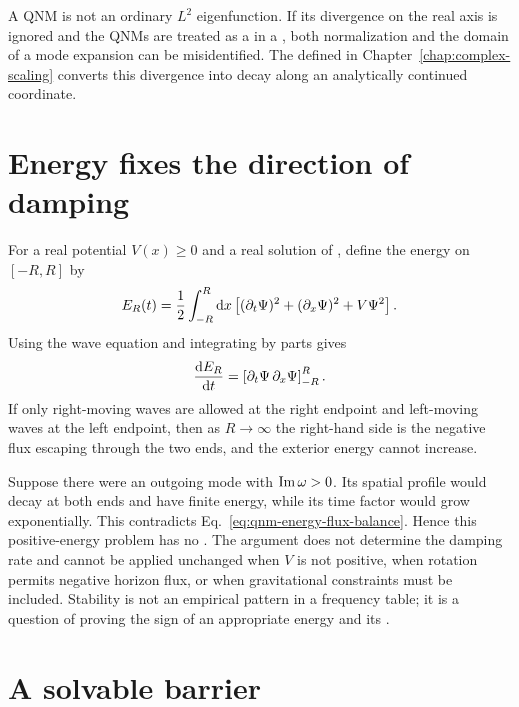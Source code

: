 \begin{warningbox}
A QNM is not an ordinary $L^2$ eigenfunction. If its divergence on the real axis is ignored and the QNMs are treated as a  in a , both normalization and the domain of a mode expansion can be misidentified. The  defined in Chapter~\ref{chap:complex-scaling} converts this divergence into decay along an analytically continued coordinate.
\end{warningbox}

\section{Energy fixes the direction of damping}

For a real potential $V(x)\geq0$ and a real solution of , define the energy on $[-R,R]$ by
\begin{equation}
E_R(t)
=
\frac{1}{2}
\int_{-R}^{R}\mathrm{d} x
\left[
(\partial_t\Psi)^2
+(\partial_x\Psi)^2
+V\Psi^2
\right].
\label{eq:qnm-energy-estimate}
\end{equation}
Using the wave equation and integrating by parts gives
\begin{equation}
\frac{\mathrm{d} E_R}{\mathrm{d} t}
=
\left[\partial_t\Psi\,\partial_x\Psi\right]_{-R}^{R}.
\label{eq:qnm-energy-flux-balance}
\end{equation}
If only right-moving waves are allowed at the right endpoint and left-moving waves at the left endpoint, then as $R\to\infty$ the right-hand side is the negative flux escaping through the two ends, and the exterior energy cannot increase.

Suppose there were an outgoing mode with $\operatorname{Im}\omega>0$. Its spatial profile would decay at both ends and have finite energy, while its time factor would grow exponentially. This contradicts Eq.~\eqref{eq:qnm-energy-flux-balance}. Hence this positive-energy problem has no . The argument does not determine the damping rate and cannot be applied unchanged when $V$ is not positive, when rotation permits negative horizon flux, or when gravitational constraints must be included. Stability is not an empirical pattern in a frequency table; it is a question of proving the sign of an appropriate energy and its .

\section{A solvable barrier}

